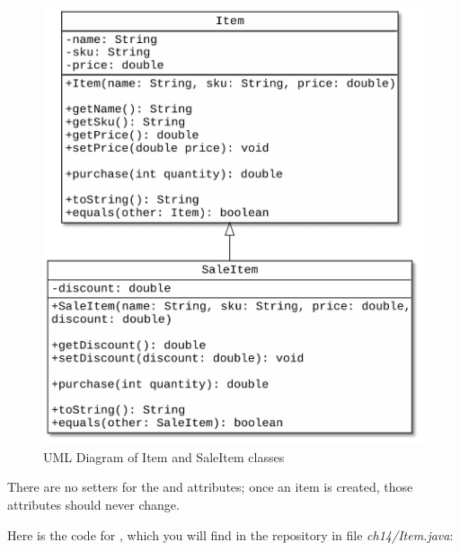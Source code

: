 \begin{figure}[!ht]
\begin{center}
\includegraphics[scale=0.5]{figs/ch14/item.pdf}
\caption{UML Diagram of Item and SaleItem classes}
\label{fig.itemObject}
\end{center}
\end{figure}

There are no setters for the  and  attributes; once an item is created, those attributes should never change.

Here is the code for , which you will find in the repository in file {\em ch14/Item.java}:

